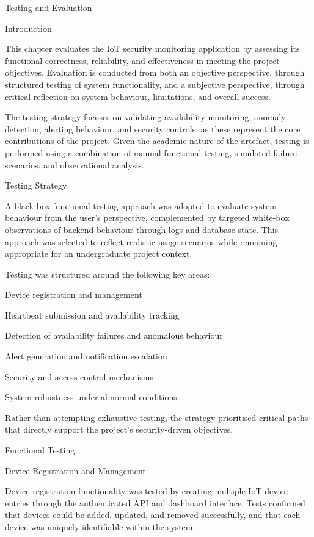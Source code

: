 Testing and Evaluation

Introduction

This chapter evaluates the IoT security monitoring application by assessing its functional correctness, reliability, and effectiveness in meeting the project objectives. Evaluation is conducted from both an objective perspective, through structured testing of system functionality, and a subjective perspective, through critical reflection on system behaviour, limitations, and overall success.

The testing strategy focuses on validating availability monitoring, anomaly detection, alerting behaviour, and security controls, as these represent the core contributions of the project. Given the academic nature of the artefact, testing is performed using a combination of manual functional testing, simulated failure scenarios, and observational analysis.

Testing Strategy

A black-box functional testing approach was adopted to evaluate system behaviour from the user's perspective, complemented by targeted white-box observations of backend behaviour through logs and database state. This approach was selected to reflect realistic usage scenarios while remaining appropriate for an undergraduate project context.

Testing was structured around the following key areas:

Device registration and management

Heartbeat submission and availability tracking

Detection of availability failures and anomalous behaviour

Alert generation and notification escalation

Security and access control mechanisms

System robustness under abnormal conditions

Rather than attempting exhaustive testing, the strategy prioritised critical paths that directly support the project's security-driven objectives.

Functional Testing

Device Registration and Management

Device registration functionality was tested by creating multiple IoT device entries through the authenticated API and dashboard interface. Tests confirmed that devices could be added, updated, and removed successfully, and that each device was uniquely identifiable within the system.

